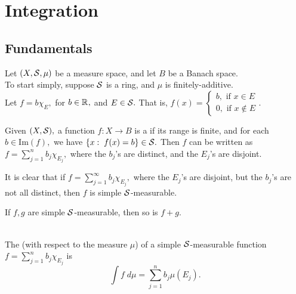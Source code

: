 \chapter{Integration}
\section{Fundamentals}
Let $(X,\mathcal{S},\mu)$ be a measure space, and let $B$ be a Banach space. \\
To start simply, suppose $\mathcal{S}$ is a ring, and $\mu$ is finitely-additive. \\
Let $f=b\chi_E,$ for $b\in\mathbb{R}^{},$ and $E\in\mathcal{S}.$ That is, $f(x)=\begin{cases}
b, \text{ if } x\in E \\
0, \text{ if } x\not\in E
\end{cases}.$

\begin{defn}
Given $(X,\mathcal{S}),$ a function $f:X\rightarrow B$ is a  if its range is finite, and for each $b\in\text{Im}(f),$ we have $\{x:\;f(x)=b\}\in\mathcal{S}.$ Then $f$ can be written as $f=\sum_{j=1}^n b_j\chi_{E_j},$ where the $b_j$'s are distinct, and the $E_j$'s are disjoint.
\end{defn}

\noindent It is clear that if $f=\sum_{j=1}^{\infty}b_j\chi_{E_j},$ where the $E_j$'s are disjoint, but the $b_j$'s are not all distinct, then $f$ is simple $\mathcal{S}$-measurable.

\begin{prop}
If $f,g$ are simple $\mathcal{S}$-measurable, then so is $f+g.$ \\ \\
\end{prop}

\begin{defn}
The  (with respect to the measure $\mu$) of a simple $\mathcal{S}$-measurable function $f=\sum_{j=1}^n b_j\chi_{E_j}$ is $$\int f\;d\mu=\sum_{j=1}^n b_j\mu(E_j).$$
\end{defn}

